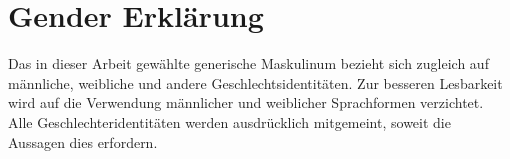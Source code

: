 \newpage
\section*{Gender Erklärung}
\thispagestyle{empty}

Das in dieser Arbeit gewählte generische Maskulinum bezieht sich zugleich auf männliche,
weibliche und andere Geschlechtsidentitäten. Zur besseren Lesbarkeit wird auf die Verwendung männlicher und weiblicher Sprachformen verzichtet. Alle Geschlechteridentitäten werden ausdrücklich mitgemeint, soweit die Aussagen dies erfordern.
